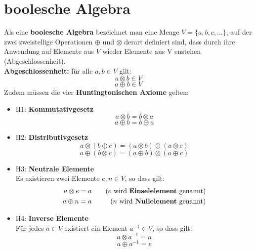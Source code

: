 \documentclass[12pt]{article}
\begin{document}
\section{boolesche Algebra}
Als eine \textbf{boolesche Algebra} bezeichnet man eine Menge $V = \{a,b,c,\dots\}$, auf der zwei zweistellige Operationen $\oplus$ und $\otimes$ derart definiert sind, dass durch ihre Anwendung auf Elemente aus $V$ wieder Elemente aus V enstehen (Abgeschlossenheit).\\
\newline
\textbf{Abgeschlossenheit:} für alle $a,b \in V$ gilt: \[a \otimes b \in V \]\[ a \oplus b \in V\]
\newpage
Zudem müssen die vier \textbf{Huntingtonischen Axiome} gelten:
\begin{itemize}
    \item H1: \textbf{Kommutativgesetz}
        \[a \otimes b = b \otimes a\]
        \[a \oplus b = b \oplus a\]
    \item H2: \textbf{Distributivgesetz}
        \[a \otimes (b \oplus c) = (a \otimes b) \oplus (a \otimes c)\]
        \[a \oplus (b \otimes c) = (a \oplus b) \otimes (a \oplus c)\]
    \item H3: \textbf{Neutrale Elemente} \\ Es existieren zwei Elemente $e,n \in V$, so dass gilt: \\
        \begin{align*}
            a \otimes e &= a \quad &(\text{$e$ wird \textbf{Einselelement} genannt})\\
            a \oplus n &= a \quad &(\text{$n$ wird \textbf{Nullelement} genannt})
        \end{align*}
    \item H4: \textbf{Inverse Elemente} \\ Für jedes $a \in V$ existiert ein Element $a^{-1} \in V$, so dass gilt: \\
        \[a \otimes a^{-1} = n\]
        \[a \oplus a^{-1} = e\]
\end{itemize}
\end{document}
